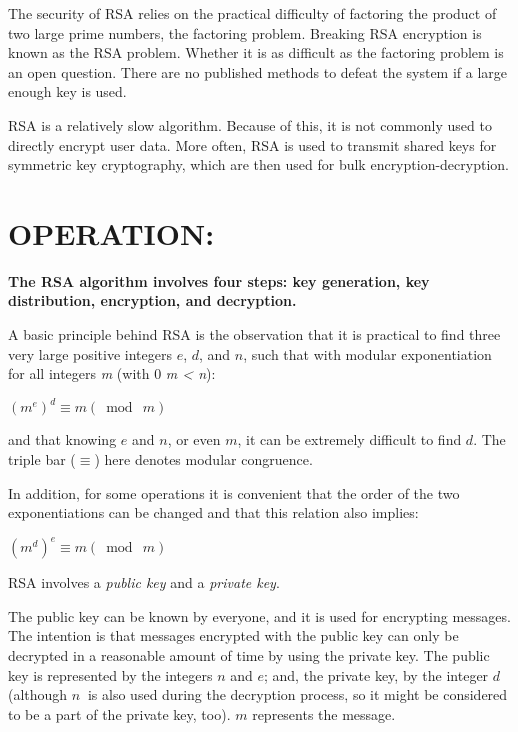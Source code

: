 \documentclass[10pt,fleqn]{article}
\begin{document}
The security of RSA relies on the practical difficulty of factoring
the product of two large prime numbers, the \textquotedbl factoring
problem\textquotedbl . Breaking RSA encryption is known as the RSA
problem. Whether it is as difficult as the factoring problem is an
open question. There are no published methods to defeat the system
if a large enough key is used.

RSA is a relatively slow algorithm. Because of this, it is not commonly
used to directly encrypt user data. More often, RSA is used to transmit
shared keys for symmetric key cryptography, which are then used for
bulk encryption-decryption.

\pagebreak{}

\section{OPERATION:}
\begin{center}
\textbf{The RSA algorithm involves four steps: key generation, key
distribution, encryption, and decryption.}
\par\end{center}

\smallskip{}

A basic principle behind RSA is the observation that it is practical
to find three very large positive integers $e$, $d$, and $n$, such
that with modular exponentiation for all integers \textit{m} (with
0 \leq\textit{ m < n}):

$(m^e)^d \equiv m (\bmod\:m)$

and that knowing $e$ and $n$, or even $m$, it can be extremely
difficult to find $d$. The triple bar ($\equiv$) here denotes modular
congruence.

In addition, for some operations it is convenient that the order of
the two exponentiations can be changed and that this relation also
implies:

$(m^d)^e \equiv m (\bmod\:m)$

\smallskip{}

\begin{center}
RSA involves a \textit{public key} and a \textit{private key}. 
\par\end{center}

The public key can be known by everyone, and it is used for encrypting
messages. The intention is that messages encrypted with the public
key can only be decrypted in a reasonable amount of time by using
the private key. The public key is represented by the integers $n$
and $e$; and, the private key, by the integer $d\:$ (although $n\:$
is also used during the decryption process, so it might be considered
to be a part of the private key, too). $m$ represents the message.
\end{document}
